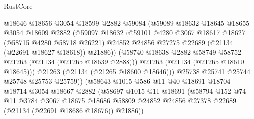 \begin{lexlean}{RustCore}
\begin{coremodule}
                          @18646
                          @18656
                          @3054
                          @18599
                          @2882
                          @59084
                          (@59089
                            @18632
                            @18645
                            @18655
                            @3054
                            @18609
                            @2882
                            (@59097
                              @18632
                              (@59101
                                @4280
                                @3067
                                @18617
                                @18627
                                (@58715 @4280 @58718 @26221)
                                @24852
                                @24856
                                @27275
                                @22689
                                (@21134 (@22691 @18627 @18618))
                                @21886))
                            (@58740
                              @18638
                              @2882
                              @58749
                              @58752
                              @21263
                              (@21134 (@21265 @18639 @2888)))
                            @21263
                            (@21134 (@21265 @18610 @18645)))
                          @21263
                          (@21134 (@21265 @18600 @18646)))
                        @25738
                        @25741
                        @25744
                        @25748
                        @25753
                        @25759))
                    (@58643
                      @1015
                      @586
                      @11
                      @40
                      @18691
                      @18704
                      @18714
                      @3054
                      @18667
                      @2882
                      (@58697
                        @1015
                        @11
                        @18691
                        (@58794
                          @152
                          @74
                          @11
                          @3784
                          @3067
                          @18675
                          @18686
                          @58809
                          @24852
                          @24856
                          @27378
                          @22689
                          (@21134 (@22691 @18686 @18676))
                          @21886))

\end{coremodule}
\end{lexlean}
